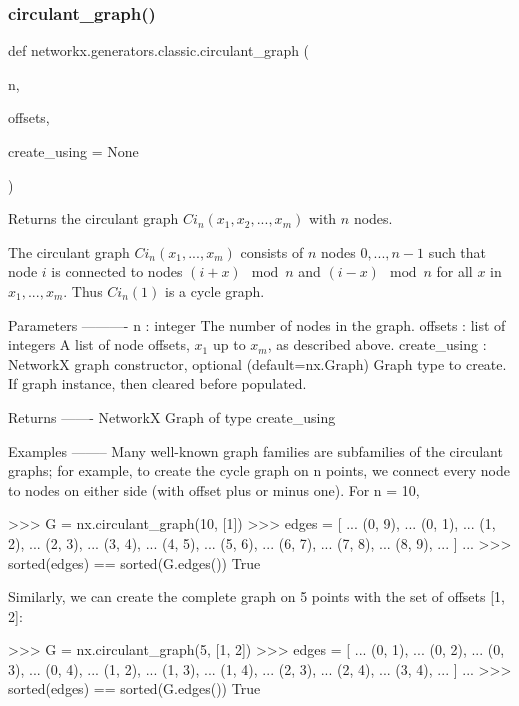 \subsubsection{\texorpdfstring{circulant\+\_\+graph()}{circulant\_graph()}}
{\footnotesize\ttfamily def networkx.\+generators.\+classic.\+circulant\+\_\+graph (\begin{DoxyParamCaption}\item[{}]{n,  }\item[{}]{offsets,  }\item[{}]{create\+\_\+using = {\ttfamily None} }\end{DoxyParamCaption})}

\begin{DoxyVerb}Returns the circulant graph $Ci_n(x_1, x_2, ..., x_m)$ with $n$ nodes.

The circulant graph $Ci_n(x_1, ..., x_m)$ consists of $n$ nodes $0, ..., n-1$
such that node $i$ is connected to nodes $(i + x) \mod n$ and $(i - x) \mod n$
for all $x$ in $x_1, ..., x_m$. Thus $Ci_n(1)$ is a cycle graph.

Parameters
----------
n : integer
    The number of nodes in the graph.
offsets : list of integers
    A list of node offsets, $x_1$ up to $x_m$, as described above.
create_using : NetworkX graph constructor, optional (default=nx.Graph)
   Graph type to create. If graph instance, then cleared before populated.

Returns
-------
NetworkX Graph of type create_using

Examples
--------
Many well-known graph families are subfamilies of the circulant graphs;
for example, to create the cycle graph on n points, we connect every
node to nodes on either side (with offset plus or minus one). For n = 10,

>>> G = nx.circulant_graph(10, [1])
>>> edges = [
...     (0, 9),
...     (0, 1),
...     (1, 2),
...     (2, 3),
...     (3, 4),
...     (4, 5),
...     (5, 6),
...     (6, 7),
...     (7, 8),
...     (8, 9),
... ]
...
>>> sorted(edges) == sorted(G.edges())
True

Similarly, we can create the complete graph
on 5 points with the set of offsets [1, 2]:

>>> G = nx.circulant_graph(5, [1, 2])
>>> edges = [
...     (0, 1),
...     (0, 2),
...     (0, 3),
...     (0, 4),
...     (1, 2),
...     (1, 3),
...     (1, 4),
...     (2, 3),
...     (2, 4),
...     (3, 4),
... ]
...
>>> sorted(edges) == sorted(G.edges())
True\end{DoxyVerb}
 \mbox{\label{namespacenetworkx_1_1generators_1_1classic_ac284fe1435875ee1af8de0ce688b85a5}} 
